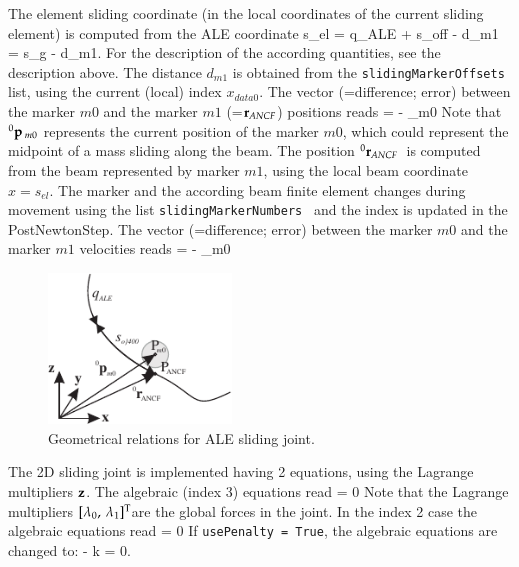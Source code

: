     The element sliding coordinate (in the local coordinates of the current sliding element) is computed from the ALE coordinate
    \be
      s_{el} = q_{ALE} + s_{off} - d_{m1} = s_g - d_{m1}.
    \ee
		For the description of the according quantities, see the description above. The distance $d_{m1}$ is obtained from the \texttt{slidingMarkerOffsets} list, using the current (local) index $x_{data0}$.
    The vector (=difference; error) between the marker $m0$ and the marker $m1$ (=$\mathbf{r}_{ANCF}$) positions reads
    \be
       =  - _{m0}
    \ee
		Note that $\prescript{0}{}{\mathbf{p}}\,_{m0}$ represents the current position of the marker $m0$, which could represent the midpoint of a mass sliding along the beam.
		The position $\prescript{0}{}{\mathbf{r}}_{ANCF}\,$ is computed from the beam represented by marker $m1$, using the local beam coordinate $x=s_{el}$. The marker and the according beam finite element changes during movement using the list \texttt{slidingMarkerNumbers } and the index is updated in the PostNewtonStep.
    The vector (=difference; error) between the marker $m0$ and the marker $m1$ velocities reads
    \be
       =  - _{m0}
    \ee
%
		\begin{figure}[tbh]
		\label{fig:ObjectJointALEmoving2D}
    \begin{center}
        \includegraphics[height=4cm]{figures/ObjectJointALEmoving2D.pdf}
    \end{center}
		\caption{Geometrical relations for ALE sliding joint.}
		\end{figure}
    The 2D sliding joint is implemented having 2 equations, using the Lagrange multipliers $\mathbf{z}$. 
    The algebraic (index 3) equations read
    \be
       = 0
    \ee
    Note that the Lagrange multipliers $[\lambda_0,\,\lambda_1]^\mathrm{T}$are the global forces in the joint.
    In the index 2 case the algebraic equations read
    \be
       = 0
    \ee
    If \texttt{usePenalty = True}, the algebraic equations are changed to:
    \be
       -  k \zv = 0.
    \ee
%

